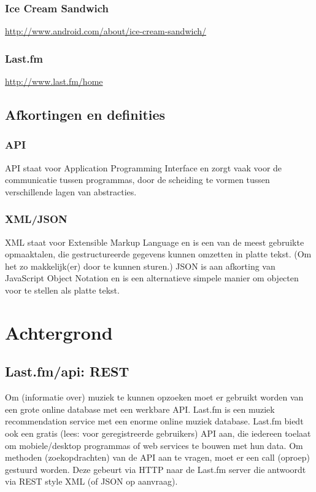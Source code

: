 \documentclass[11pt,a4paper]{article}
\begin{document}
		\subsubsection{Ice Cream Sandwich}
			\url{http://www.android.com/about/ice-cream-sandwich/}	
		\subsubsection{Last.fm}
			\url{http://www.last.fm/home}	

	\subsection{Afkortingen en definities}
		\subsubsection{API}
		API staat voor Application Programming Interface en zorgt vaak voor de communicatie tussen programmas, door de scheiding te vormen tussen verschillende lagen van abstracties.
		\subsubsection{XML/JSON}
		XML staat voor Extensible Markup Language en is een van de meest gebruikte opmaaktalen, die gestructureerde gegevens kunnen omzetten in platte tekst. (Om het zo makkelijk(er) door te kunnen sturen.)
		\newline
		JSON is aan afkorting van JavaScript Object Notation en is een alternatieve simpele manier om objecten voor te stellen als platte tekst.

\section{Achtergrond}
	\subsection{Last.fm/api: REST}
Om (informatie over) muziek te kunnen opzoeken moet er gebruikt worden van een grote online database met een werkbare API. Last.fm is een muziek recommendation service met een enorme online muziek database. Last.fm biedt ook een gratis (lees: voor geregistreerde gebruikers) API aan, die iedereen toelaat om mobiele/desktop programmas of web services te bouwen met hun data.
\newline
Om methoden (zoekopdrachten) van de API aan te vragen, moet er een call (oproep) gestuurd worden. Deze gebeurt via HTTP naar de Last.fm server die antwoordt via REST style XML (of JSON op aanvraag).
\end{document}

